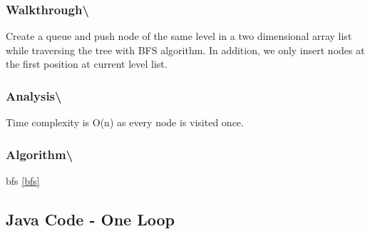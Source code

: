 \documentclass[]{book}
\begin{document}
\hypertarget{walkthrough-58}{%
\subsubsection{Walkthrough\textbackslash{}}\label{walkthrough-58}}

Create a queue and push node of the same level in a two dimensional array list while traversing the tree with
BFS algorithm. In addition, we only insert nodes at the first position at current level list.

\hypertarget{analysis-65}{%
\subsubsection{Analysis\textbackslash{}}\label{analysis-65}}

Time complexity is O(n) as every node is visited once.

\hypertarget{algorithm-67}{%
\subsubsection{Algorithm\textbackslash{}}\label{algorithm-67}}

bfs \ref{bfs}

\hypertarget{java-code---one-loop}{%
\subsection{Java Code - One Loop}\label{java-code---one-loop}}
\end{document}
